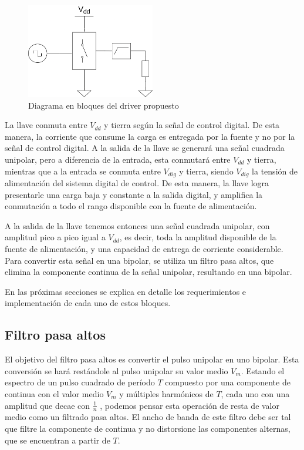 \begin{figure}[tbp]
    \centering
    \includegraphics[width=0.5\textwidth]{images/driver.drawio.png}
    \caption{Diagrama en bloques del driver propuesto}
    \label{fig:driver_block_diagram}
\end{figure}

La llave conmuta entre $V_{dd}$ y tierra según la señal de control digital. De
esta manera, la corriente que consume la carga es entregada por la fuente y no
por la señal de control digital. A la salida de la llave se generará una señal
cuadrada unipolar, pero a diferencia de la entrada, esta conmutará entre
$V_{dd}$ y tierra, mientras que a la entrada se conmuta entre $V_{dig}$ y
tierra, siendo $V_{dig}$ la tensión de alimentación del sistema digital de
control. De esta manera, la llave logra presentarle una carga baja y constante a
la salida digital, y amplifica la conmutación a todo el rango disponible con la
fuente de alimentación.

A la salida de la llave tenemos entonces una señal cuadrada unipolar, con
amplitud pico a pico igual a $V_{dd}$, es decir, toda la amplitud disponible de
la fuente de alimentación, y una capacidad de entrega de corriente considerable.
Para convertir esta señal en una bipolar, se utiliza un filtro pasa altos, que
elimina la componente continua de la señal unipolar, resultando en una bipolar.

En las próximas secciones se explica en detalle los requerimientos e
implementación de cada uno de estos bloques.

\subsection{Filtro pasa altos}

El objetivo del filtro pasa altos es convertir el pulso unipolar en uno bipolar.
Esta conversión se hará restándole al pulso unipolar su valor medio $V_m$.
Estando el espectro de un pulso cuadrado de período $T$ compuesto por una
componente de continua con el valor medio $V_{m}$ y múltiples harmónicos de $T$,
cada uno con una amplitud que decae con $\frac{1}{n}$ \cite{hsu1970analisis},
podemos pensar esta operación de resta de valor medio como un filtrado pasa
altos.  El ancho de banda de este filtro debe ser tal que filtre la componente
de continua y no distorsione las componentes alternas, que se encuentran a
partir de $T$.

